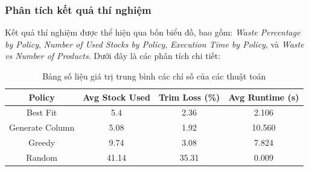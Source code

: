 \subsubsection{Phân tích kết quả thí nghiệm}

Kết quả thí nghiệm được thể hiện qua bốn biểu đồ, bao gồm: \textit{Waste Percentage by Policy}, \textit{Number of Used Stocks by Policy}, \textit{Execution Time by Policy}, và \textit{Waste vs Number of Products}. Dưới đây là các phân tích chi tiết:


\begin{table}[!htp]
    \centering
    \begin{tabular}{|c|c|c|c|} \hline 
       \textbf{  Policy}&  \textbf{Avg Stock Use}d&  \textbf{Trim Loss} (\%)& \textbf{ Avg Runtime (s)}
\\ \hline 
         Best Fit&  5.4&  2.36&  2.106
\\ \hline 
         Generate Column&  5.08&  1.92&  10.560
\\ \hline 
         Greedy&  9.74&  3.08&  7.824
\\ \hline 
         Random&  41.14&  35.31&  0.009\\ \hline
    \end{tabular}
    \caption{Bảng số liệu giá trị trung bình các chỉ số của các thuật toán}
    \label{tab:result}
\end{table}

